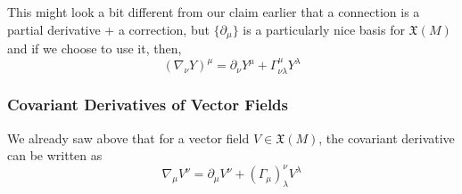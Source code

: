\documentclass[11pt]{article}
\begin{document}
This might look a bit different from our claim earlier that a connection is a partial derivative + a correction, but $\{\partial_{\mu}\}$ is a particularly nice basis for $\mathfrak{X}(M)$ and if we choose to use it, then,
\[ \boxed{(\nabla_{\nu} Y)^{\mu} = \partial_{\nu} Y^{\mu} + \Gamma_{\nu \lambda}^{\mu} Y^{\lambda}} \]




\vskip 1cm
\subsubsection{Covariant Derivatives of Vector Fields}
We already saw above that for a vector field $V \in \mathfrak{X}(M)$, the covariant derivative can be written as 
\[  \nabla_{\mu} V^{\nu} = \partial_{\mu} V^{\nu} + (\Gamma_{\mu})_{\lambda}^{\nu} V^{\lambda} \]
\end{document}
